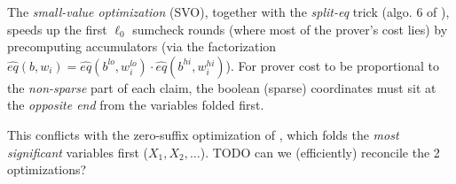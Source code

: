 \documentclass{article}
\theoremstyle{definition}
\begin{document}
The \emph{small-value optimization} (SVO), together with the \emph{split-eq} trick (algo. 6 of \cite{Speeding-Up-Sum-Check-Proving}), speeds up the first $\ell_0$  sumcheck rounds (where most of the prover's cost lies) by precomputing accumulators (via the factorization $\hat{eq}(b, w_i) = \hat{eq}(b^{lo}, w_i^{lo}) \cdot \hat{eq}(b^{hi}, w_i^{hi})$). For prover cost to be proportional to the \emph{non-sparse} part of each claim, the boolean (sparse) coordinates must sit at the \emph{opposite end} from the variables folded first.

This conflicts with the zero-suffix optimization of , which folds the \emph{most significant} variables first ($X_1, X_2, \dots$). TODO can we (efficiently) reconcile the 2 optimizations?

\clearpage


\end{document}
